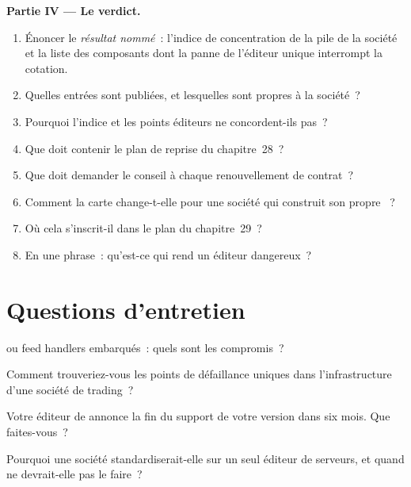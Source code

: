 \begin{problem}
\medskip\noindent\textbf{Partie IV --- Le verdict.}
\begin{enumerate}[resume]
\item Énoncer le \emph{résultat nommé}~: l'indice de concentration de la pile de la société et la liste des composants dont la panne de l'éditeur unique
  interrompt la cotation.
\item Quelles entrées sont publiées, et lesquelles sont propres à la société~?
\item Pourquoi l'indice et les points éditeurs ne concordent-ils pas~?
\item Que doit contenir le plan de reprise du chapitre~28~?
\item Que doit demander le conseil à chaque renouvellement de contrat~?
\item Comment la carte change-t-elle pour une société qui construit son propre ~?
\item Où cela s'inscrit-il dans le plan du chapitre~29~?
\item En une phrase~: qu'est-ce qui rend un éditeur dangereux~?
\end{enumerate}
\end{problem}

\section{Questions d'entretien}

\begin{interviewq}\label{iq:nw:the-vendor-map:1}
 ou feed handlers embarqués~: quels sont les compromis~?
\end{interviewq}

\begin{interviewq}\label{iq:nw:the-vendor-map:2}
Comment trouveriez-vous les points de défaillance uniques dans l'infrastructure d'une société de trading~?
\end{interviewq}

\begin{interviewq}\label{iq:nw:the-vendor-map:3}
Votre éditeur de  annonce la fin du support de votre version dans six mois. Que faites-vous~?
\end{interviewq}

\begin{interviewq}\label{iq:nw:the-vendor-map:4}
Pourquoi une société standardiserait-elle sur un seul éditeur de serveurs, et quand ne devrait-elle pas le faire~?
\end{interviewq}

